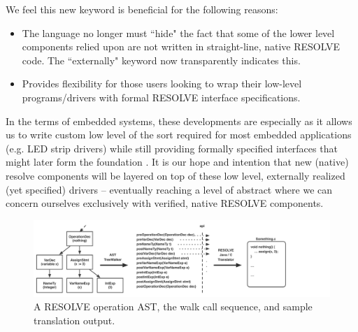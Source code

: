 \documentclass{sig-alternate}
\begin{document}

We feel this new keyword is beneficial for the following reasons:
\begin{itemize}
\item The language no longer must ``hide" the fact that some of the lower level components relied upon are not written in straight-line, native RESOLVE code. The ``externally" keyword now transparently indicates this.
\item Provides flexibility for those users looking to wrap their low-level programs/drivers with formal RESOLVE interface specifications.
\end{itemize}

In the terms of embedded systems, these developments are especially as it allows us to write custom low level of the sort required for most embedded applications (e.g. LED strip drivers) while still providing formally specified interfaces that might later form the foundation . It is our hope and intention that new (native) resolve components will be layered on top of these low level, externally realized (yet specified) drivers -- eventually reaching a level of abstract where we can concern ourselves exclusively with verified, native RESOLVE components.





\begin{figure}
\centering
\includegraphics[scale=.55]{figs/ast_traversal.pdf}
\caption{A RESOLVE operation AST, the walk call sequence, and sample translation output.}
\end{figure}
\label{fig:ast}

\end{document}
